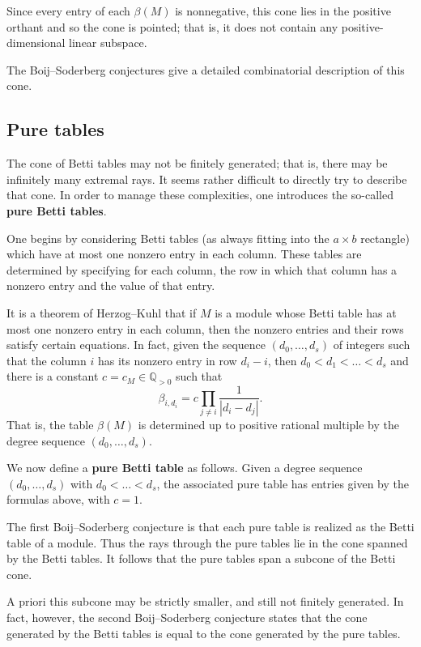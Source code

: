 \documentclass[12pt]{amsart}
\theoremstyle{plain}
\theoremstyle{definition}
\theoremstyle{remark}
\newcommand{\Q}{\mathbb{Q}}
\newcommand{\defining}[1]{\textbf{#1}}
\begin{document}
Since every entry of each $\beta(M)$ is nonnegative, this cone lies in the positive orthant
and so the cone is pointed; that is, it does not contain any positive-dimensional linear subspace.

The Boij--Soderberg conjectures give a detailed combinatorial description of this cone.

\subsection{Pure tables}
The cone of Betti tables may not be finitely generated; that is, there may be infinitely many
extremal rays.
It seems rather difficult to directly try to describe that cone.
In order to manage these complexities, one introduces the so-called \defining{pure Betti tables}.

One begins by considering Betti tables (as always fitting into the $a \times b$ rectangle)
which have at most one nonzero entry in each column.
These tables are determined by specifying for each column, the row in which that column
has a nonzero entry and the value of that entry.

It is a theorem of Herzog--Kuhl that if $M$ is a module whose Betti table has at most
one nonzero entry in each column, then the nonzero entries and their rows satisfy
certain equations.
In fact, given the sequence $(d_0,\dots,d_s)$ of integers such that the column $i$
has its nonzero entry in row $d_i-i$, then $d_0 < d_1 < \dots < d_s$
and there is a constant $c = c_M \in \Q_{> 0}$ such that
\[
  \beta_{i,d_i} = c \prod_{j \neq i} \frac{1}{|d_i - d_j|} .
\]
That is, the table $\beta(M)$ is determined up to positive rational multiple by the
degree sequence $(d_0,\dots,d_s)$.

We now define a \defining{pure Betti table} as follows.
Given a degree sequence $(d_0,\dots,d_s)$ with $d_0 < \dots < d_s$,
the associated pure table has entries given by the formulas above, with $c=1$.

The first Boij--Soderberg conjecture is that each pure table is realized as the Betti table of a module.
Thus the rays through the pure tables lie in the cone spanned by the Betti tables.
It follows that the pure tables span a subcone of the Betti cone.

A priori this subcone may be strictly smaller, and still not finitely generated.
In fact, however, the second Boij--Soderberg conjecture states that the cone generated by the Betti tables
is equal to the cone generated by the pure tables.
\end{document}

